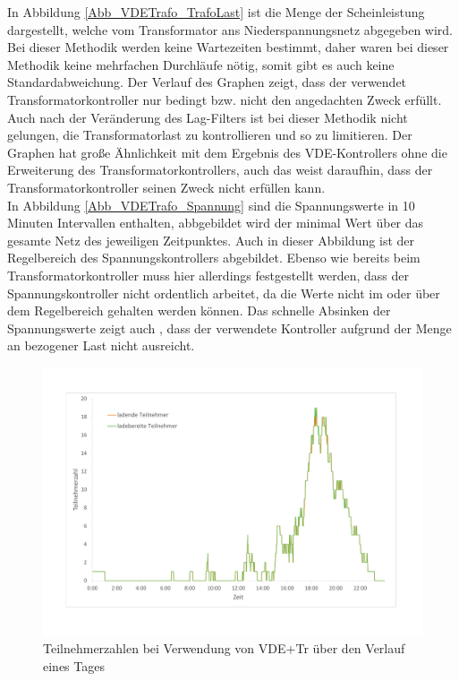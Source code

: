 In Abbildung \ref{Abb_VDETrafo_TrafoLast} ist die Menge der Scheinleistung dargestellt, welche vom Transformator ans Niederspannungsnetz abgegeben wird. Bei dieser Methodik werden keine Wartezeiten bestimmt, daher waren bei dieser Methodik keine mehrfachen Durchläufe nötig, somit gibt es auch keine Standardabweichung. Der Verlauf des Graphen zeigt, dass der verwendet Transformatorkontroller nur bedingt bzw. nicht den angedachten Zweck erfüllt. Auch nach der Veränderung des Lag-Filters ist bei dieser Methodik nicht gelungen, die Transformatorlast zu kontrollieren und so zu limitieren. Der Graphen hat große Ähnlichkeit mit dem Ergebnis des VDE-Kontrollers ohne die Erweiterung des Transformatorkontrollers, auch das weist daraufhin, dass der Transformatorkontroller seinen Zweck nicht erfüllen kann. \\
In Abbildung \ref{Abb_VDETrafo_Spannung} sind die Spannungswerte in 10 Minuten Intervallen enthalten, abbgebildet wird der minimal Wert über das gesamte Netz des jeweiligen Zeitpunktes.
Auch in dieser Abbildung ist der Regelbereich des Spannungskontrollers abgebildet. Ebenso wie bereits beim Transformatorkontroller muss hier allerdings festgestellt werden, dass der Spannungskontroller nicht ordentlich arbeitet, da die Werte nicht im oder über dem Regelbereich gehalten werden können. Das schnelle Absinken der Spannungswerte zeigt auch , dass der verwendete Kontroller aufgrund der Menge an bezogener Last nicht ausreicht.
\begin{figure}[htb]
\centering
	\includegraphics[scale=0.45]{img/VDE_tau_trafo/Teilnehmer3.pdf}
	\caption{Teilnehmerzahlen bei Verwendung von VDE+Tr über den Verlauf eines Tages}
	\label{Abb_VDETrafo_Teilnehmer}
\end{figure}

